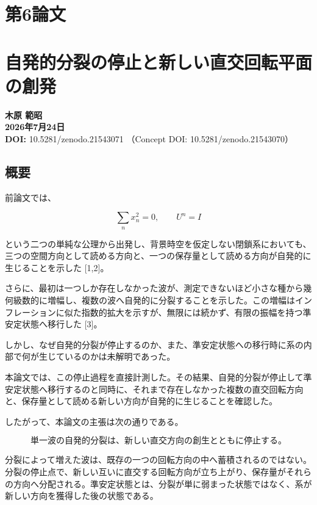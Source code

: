 \documentclass[
  a4paper,
]{ltjsarticle}
\author{}
\date{}
\begin{document}
\section{第6論文}\label{ux7b2c6ux8ad6ux6587}

\section{自発的分裂の停止と新しい直交回転平面の創発}\label{ux81eaux767aux7684ux5206ux88c2ux306eux505cux6b62ux3068ux65b0ux3057ux3044ux76f4ux4ea4ux56deux8ee2ux5e73ux9762ux306eux5275ux767a}

\textbf{木原 範昭}\\
\textbf{2026年7月24日}\\
\textbf{DOI:} 10.5281/zenodo.21543071 （Concept DOI:
10.5281/zenodo.21543070）

\subsection{概要}\label{ux6982ux8981}

前論文では、

\[
\sum_n x_n^2=0,
\qquad
U^n=I
\]

という二つの単純な公理から出発し、背景時空を仮定しない閉鎖系においても、三つの空間方向として読める方向と、一つの保存量として読める方向が自発的に生じることを示した
{[}1,2{]}。

さらに、最初は一つしか存在しなかった波が、測定できないほど小さな種から幾何級数的に増幅し、複数の波へ自発的に分裂することを示した。この増幅はインフレーションに似た指数的拡大を示すが、無限には続かず、有限の振幅を持つ準安定状態へ移行した
{[}3{]}。

しかし、なぜ自発的分裂が停止するのか、また、準安定状態への移行時に系の内部で何が生じているのかは未解明であった。

本論文では、この停止過程を直接計測した。その結果、自発的分裂が停止して準安定状態へ移行するのと同時に、それまで存在しなかった複数の直交回転方向と、保存量として読める新しい方向が自発的に生じることを確認した。

したがって、本論文の主張は次の通りである。

\[
\boxed{
\text{単一波の自発的分裂は、新しい直交方向の創生とともに停止する。}
}
\]

分裂によって増えた波は、既存の一つの回転方向の中へ蓄積されるのではない。分裂の停止点で、新しい互いに直交する回転方向が立ち上がり、保存量がそれらの方向へ分配される。準安定状態とは、分裂が単に弱まった状態ではなく、系が新しい方向を獲得した後の状態である。
\end{document}
